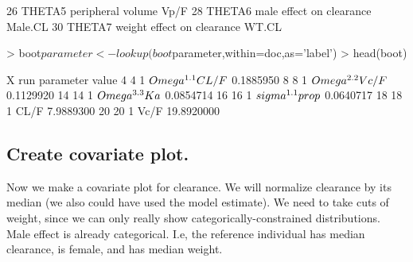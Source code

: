 \begin{Schunk}
\begin{Soutput}
26    THETA5                             peripheral volume                Vp/F
28    THETA6                      male effect on clearance             Male.CL
30    THETA7                    weight effect on clearance               WT.CL
\end{Soutput}
\begin{Sinput}
> boot$parameter <- lookup(boot$parameter,within=doc,as='label')
> head(boot)
\end{Sinput}
\begin{Soutput}
    X run           parameter      value
4   4   1 $\\Omega^{1.1}CL/F$  0.1885950
8   8   1 $\\Omega^{2.2}Vc/F$  0.1129920
14 14   1   $\\Omega^{3.3}Ka$  0.0854714
16 16   1 $\\sigma^{1.1}prop$  0.0640717
18 18   1                CL/F  7.9889300
20 20   1                Vc/F 19.8920000
\end{Soutput}
\end{Schunk}
\subsection{Create covariate plot.}
Now we make a covariate plot for clearance.  We will normalize clearance 
by its median (we also could have used the model estimate).  We need to take 
cuts of weight, since we can only really show categorically-constrained distributions.
Male effect is already categorical.  I.e, the reference individual has median
clearance, is female, and has median weight.
